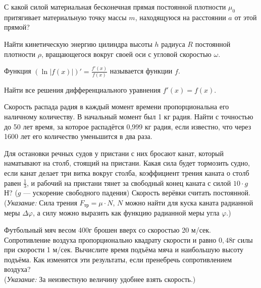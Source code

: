 \documentclass[12pt]{article}
\begin{document}
С какой силой материальная бесконечная прямая постоянной плотности $\mu_0$ притягивает материальную точку массы $m$, находящуюся на расстоянии  $a$ от
этой прямой?

Найти кинетическую энергию цилиндра высоты $h$ радиуса $R$ постоянной плотности $\rho$, вращающегося вокруг своей оси с угловой скоростью $\omega$.

 Функция $(\ln |f(x)|)' = \frac{f'(x)}{f(x)}$ называется  функции $f$.

Найти все решения дифференциального уравнения $f'(x) = f(x)$.

Скорость распада радия в каждый момент времени пропорциональна его наличному количеству. В начальный момент был 1 кг радия. Найти с точностью до 50 лет
время, за которое распадётся 0,999 кг радия, если известно, что через 1600 лет его количество уменьшится в два раза.

Для остановки речных судов у пристани с них бросают канат, который наматывают на столб,
стоящий на пристани. Какая сила будет тормозить судно, если канат делает три витка вокруг столба,
коэффициент трения каната о столб равен $\frac13$, и рабочий на пристани тянет за свободный конец
каната с силой $10\cdot g$ Н? ($g$ --- ускорение свободного падения) Скорость верёвки считать постоянной.\\
({\sl Указание:}
Сила трения $F_{тр} = \mu \cdot N$, $N$ можно найти для куска каната радианной меры
$\Delta \varphi$, а силу можно выразить как функцию радианной меры
угла $\varphi$.)



% 
% 
% 

Футбольный мяч весом 400г брошен вверх со скоростью 20 м/сек. 
Сопротивление воздуха пропорционально квадрату скорости и равно $0{,}48$г силы при скорости 1 м/сек.
Вычислите время подъёма мяча и наибольшую высоту подъёма.
Как изменятся эти результаты, если пренебречь сопротивлением воздуха?
\\({\sl Указание:}
За неизвестную величину удобнее взять скорость.)



\end{document}
